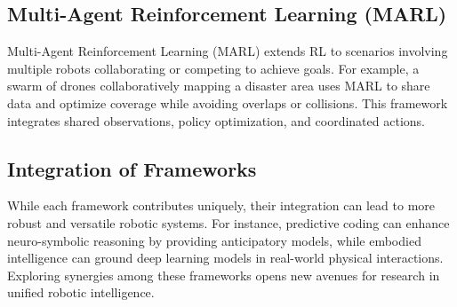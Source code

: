     \subsection{Multi-Agent Reinforcement Learning (MARL)}
    Multi-Agent Reinforcement Learning (MARL) extends RL to scenarios involving multiple robots collaborating or competing to achieve goals. For example, a swarm of drones collaboratively mapping a disaster area uses MARL to share data and optimize coverage while avoiding overlaps or collisions. This framework integrates shared observations, policy optimization, and coordinated actions. 

    \subsection{Integration of Frameworks}
    While each framework contributes uniquely, their integration can lead to more robust and versatile robotic systems. For instance, predictive coding can enhance neuro-symbolic reasoning by providing anticipatory models, while embodied intelligence can ground deep learning models in real-world physical interactions. Exploring synergies among these frameworks opens new avenues for research in unified robotic intelligence.

    
